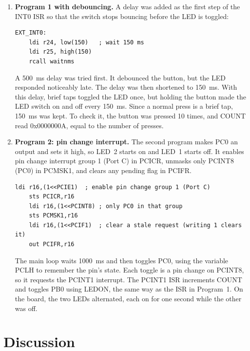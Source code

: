 \documentclass[11pt]{article}
\begin{document}
\begin{enumerate}
From the rcall to the ret, the subroutine takes $16004n + 25$ cycles, which predicts 16029, 160065, and 16004025 cycles for $n = 1$, 10, and 1000, so a 1000~ms request lasts 1.00025~s.

\item \textbf{Program 1 with debouncing.} A delay was added as the first step of the INT0 ISR so that the switch stops bouncing before the LED is toggled:

\begin{lstlisting}[language=avrasm,caption={Start of the debounced INT0 ISR.},label={code:debounce}]
EXT_INT0:
    ldi r24, low(150)   ; wait 150 ms
    ldi r25, high(150)
    rcall waitnms
\end{lstlisting}

A 500~ms delay was tried first. It debounced the button, but the LED responded noticeably late. The delay was then shortened to 150~ms. With this delay, brief taps toggled the LED once, but holding the button made the LED switch on and off every 150~ms. Since a normal press is a brief tap, 150~ms was kept. To check it, the button was pressed 10 times, and COUNT read 0x0000000A, equal to the number of presses.

\item \textbf{Program 2: pin change interrupt.} The second program makes PC0 an output and sets it high, so LED~2 starts on and LED~1 starts off. It enables pin change interrupt group 1 (Port C) in PCICR, unmasks only PCINT8 (PC0) in PCMSK1, and clears any pending flag in PCIFR.

\begin{lstlisting}[language=avrasm,caption={Pin change interrupt setup for PC0.},label={code:pcint}]
    ldi r16,(1<<PCIE1)  ; enable pin change group 1 (Port C)
    sts PCICR,r16
    ldi r16,(1<<PCINT8) ; only PC0 in that group
    sts PCMSK1,r16
    ldi r16,(1<<PCIF1)  ; clear a stale request (writing 1 clears it)
    out PCIFR,r16
\end{lstlisting}

The main loop waits 1000~ms and then toggles PC0, using the variable PCLH to remember the pin's state. Each toggle is a pin change on PCINT8, so it requests the PCINT1 interrupt. The PCINT1 ISR increments COUNT and toggles PB0 using LEDON, the same way as the ISR in Program~1. On the board, the two LEDs alternated, each on for one second while the other was off.
\end{enumerate}

\section{Discussion}
\end{document}
